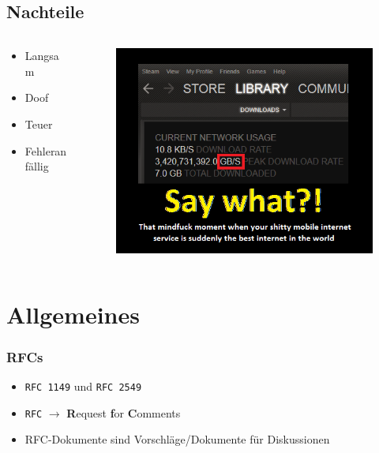 \documentclass{beamer}
\begin{document}
	\subsection{Nachteile}
	\begin{frame}
		\begin{columns}
			\begin{column}{0.35\textwidth}
				\begin{itemize}
					\item Langsam 
					\item Doof 
					\item Teuer 
					\item Fehleranfällig 
				\end{itemize}
			\end{column}
			\begin{column}{0.55\textwidth}
				\begin{figure}[ht]	\href{http://fc04.deviantart.net/fs70/f/2013/095/9/f/say_what____internet_speed_meme__by_benchamberlainneo-d60j8sz.png\# this-image-is-creative-commons}{\includegraphics[width=\textwidth,keepaspectratio]{./images/speed}}
				\end{figure}
			\end{column}
		\end{columns}
	\end{frame}
	\section{Allgemeines}
	\subsubsection{RFCs}
	\begin{frame}
		\begin{itemize}
			\item \texttt{RFC 1149} und \texttt{RFC 2549}
			\item \texttt{RFC} $\rightarrow$ \textbf{R}equest \textbf{f}or \textbf{C}omments
			\item RFC-Dokumente sind Vorschläge/Dokumente für Diskussionen
		\end{itemize}
	\end{frame}
\end{document}
